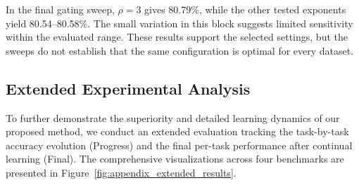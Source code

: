 \documentclass[journal]{IEEEtran}
\theoremstyle{plain}
\theoremstyle{definition}
\theoremstyle{remark}
\begin{document}
In the final gating sweep, $\rho=3$ gives 80.79\%, while the other tested exponents yield 80.54--80.58\%. The small variation in this block suggests limited sensitivity within the evaluated range. These results support the selected settings, but the sweeps do not establish that the same configuration is optimal for every dataset.

\subsection{Extended Experimental Analysis}
\label{sec:extended_analysis}

To further demonstrate the superiority and detailed learning dynamics of our proposed method, we conduct an extended evaluation tracking the task-by-task accuracy evolution (Progress) and the final per-task performance after continual learning (Final). The comprehensive visualizations across four benchmarks are presented in Figure~\ref{fig:appendix_extended_results}.
\end{document}
